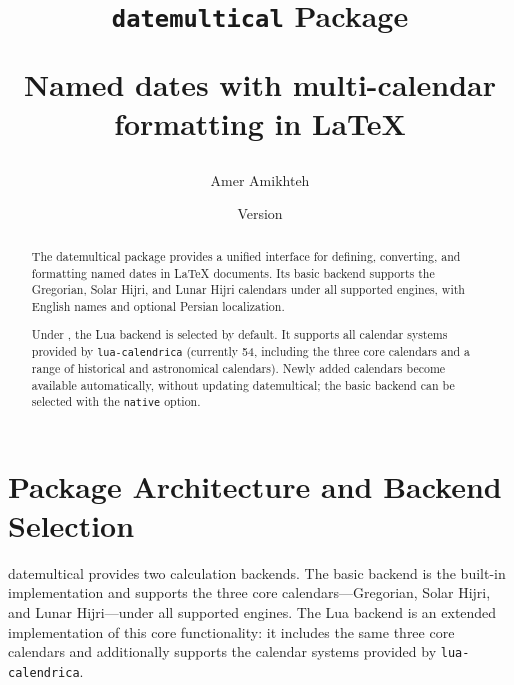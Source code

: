 \documentclass[10pt]{article}
\title{{\Huge\bfseries \texttt{datemultical} Package }\par
    \large Named dates with multi-calendar formatting
    in \LaTeX}
\author{Amer Amikhteh}
\date{%
    Version \pkgmeta[version]{datemultical}\\[2pt]
    \dmc{datemultical}{long}
}
\newcommand{\LuaLaTeXLogo}{\hologo{LuaLaTeX}}
\newcommand{\pkg}[1]{\textsf{#1}}
\begin{document}
\maketitle
\thispagestyle{empty}

\begin{abstract}
    The \pkg{datemultical} package provides a unified interface for defining,
    converting, and formatting named dates in \LaTeX{} documents. Its basic
    backend supports the Gregorian, Solar Hijri, and Lunar Hijri calendars under
    all supported engines, with English names and optional Persian localization.

    Under \LuaLaTeXLogo{}, the Lua backend is selected by default. It supports
    all calendar systems provided by \texttt{lua-calendrica}
    (currently 54, including the three core calendars and a range of historical
    and astronomical calendars). Newly added calendars become available
    automatically, without updating \pkg{datemultical}; the basic backend can
    be selected with the \texttt{native} option.
\end{abstract}







\section{Package Architecture and Backend Selection}

\pkg{datemultical} provides two calculation backends. The basic backend is
the built-in implementation and supports the three core calendars---Gregorian,
Solar Hijri, and Lunar Hijri---under all supported engines. The Lua backend is
an extended implementation of this core functionality: it includes the same
three core calendars and additionally supports the calendar systems provided by
\texttt{lua-calendrica}.
\end{document}
